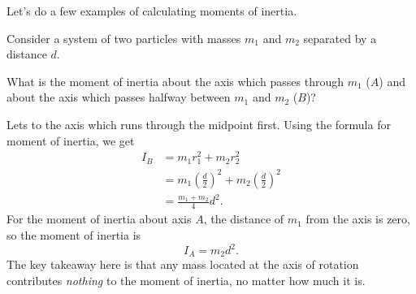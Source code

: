 \documentclass[../classical_mechanics.tex]{subfiles}
\begin{document}
            Let's do a few examples of calculating moments of inertia.
            \begin{example}
                Consider a system of two particles with masses $m_1$ and $m_2$ separated by a distance $d$.
                \begin{figure}[H]
                    \centering
                \end{figure}
                What is the moment of inertia about the axis which passes through $m_1$ ($A$) and about the axis which passes halfway between $m_1$ and $m_2$ ($B$)?

                Lets to the axis which runs through the midpoint first.
                Using the formula for moment of inertia, we get
                \begin{align}
                    I_B&=m_1r_1^2+m_2r_2^2\\
                    &=m_1\left(\frac{d}{2}\right)^2+m_2\left(\frac{d}{2}\right)^2\\
                    &=\frac{m_1+m_2}{4}d^2.
                \end{align}
                For the moment of inertia about axis $A$, the distance of $m_1$ from the axis is zero, so the moment of inertia is
                \begin{equation}
                    I_A=m_2 d^2.
                \end{equation}
                The key takeaway here is that any mass located at the axis of rotation contributes \textit{nothing} to the moment of inertia, no matter how much it is.
            \end{example}
\end{document}
